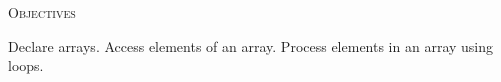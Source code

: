 


\renewcommand\TITLE{Assignment 11}
\usepackage{import}


\topmatter

\textsc{Objectives}
 \begin{myenum}
   \li Declare arrays.
   \li Access elements of an array.
   \li Process elements in an array using loops.
 \end{myenum}




